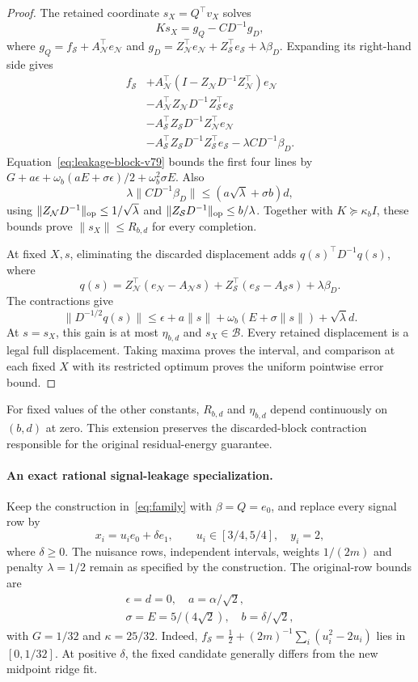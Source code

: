 \begin{proof}
The retained coordinate $s_X=Q^\top v_X$ solves
\[
 Ks_X=g_Q-CD^{-1}g_D,
\]
where $g_Q=f_{\mathcal S}+A_{\mathcal N}^\top e_{\mathcal N}$ and
$g_D=Z_{\mathcal N}^\top e_{\mathcal N}+Z_{\mathcal S}^\top e_{\mathcal S}+\lambda\beta_D$.
Expanding its right-hand side gives
\begin{align*}
 f_{\mathcal S}
 &+A_{\mathcal N}^\top(I-Z_{\mathcal N}D^{-1}Z_{\mathcal N}^\top)e_{\mathcal N}\\
 &-A_{\mathcal N}^\top Z_{\mathcal N}D^{-1}Z_{\mathcal S}^\top e_{\mathcal S}\\
 &-A_{\mathcal S}^\top Z_{\mathcal S}D^{-1}Z_{\mathcal N}^\top e_{\mathcal N}\\
 &-A_{\mathcal S}^\top Z_{\mathcal S}D^{-1}Z_{\mathcal S}^\top e_{\mathcal S}
 -\lambda CD^{-1}\beta_D.
\end{align*}
Equation~\eqref{eq:leakage-block-v79} bounds the first four lines by
$G+a\epsilon+\omega_b(aE+\sigma\epsilon)/2+\omega_b^2\sigma E$.
Also
\[
 \lambda\|CD^{-1}\beta_D\|
 \le(a\sqrt\lambda+\sigma b)d,
\]
using $\|Z_{\mathcal N}D^{-1}\|_{\mathrm{op}}\le1/\sqrt\lambda$ and
$\|Z_{\mathcal S}D^{-1}\|_{\mathrm{op}}\le b/\lambda$.
Together with $K\succeq\kappa_bI$, these bounds prove
$\|s_X\|\le R_{b,d}$ for every completion.

At fixed $X,s$, eliminating the discarded displacement adds $q(s)^\top D^{-1}q(s)$, where
\[
 q(s)=Z_{\mathcal N}^\top(e_{\mathcal N}-A_{\mathcal N}s)
 +Z_{\mathcal S}^\top(e_{\mathcal S}-A_{\mathcal S}s)+\lambda\beta_D.
\]
The contractions give
\[
 \|D^{-1/2}q(s)\|
 \le\epsilon+a\|s\|+\omega_b(E+\sigma\|s\|)+\sqrt\lambda d.
\]
At $s=s_X$, this gain is at most $\eta_{b,d}$ and $s_X\in\mathcal B$.
Every retained displacement is a legal full displacement. Taking maxima proves the interval, and comparison at each fixed $X$ with its restricted optimum proves the uniform pointwise error bound.
\end{proof}

For fixed values of the other constants, $R_{b,d}$ and $\eta_{b,d}$ depend continuously on $(b,d)$ at zero. This extension preserves the discarded-block contraction responsible for the original residual-energy guarantee.

\paragraph{An exact rational signal-leakage specialization.}
Keep the construction in~\eqref{eq:family} with $\beta=Q=e_0$, and replace every signal row by
\[
 x_i=u_i e_0+\delta e_1,\qquad u_i\in[3/4,5/4],\quad y_i=2,
\]
where $\delta\ge0$. The nuisance rows, independent intervals, weights $1/(2m)$ and penalty $\lambda=1/2$ remain as specified by the construction. The original-row bounds are
\begin{gather*}
 \epsilon=d=0,\quad a=\alpha/\sqrt2,\\
 \sigma=E=5/(4\sqrt2),\quad b=\delta/\sqrt2,
\end{gather*}
with $G=1/32$ and $\kappa=25/32$.
Indeed, $f_{\mathcal S}=\tfrac12+(2m)^{-1}\sum_i(u_i^2-2u_i)$ lies in $[0,1/32]$.
At positive $\delta$, the fixed candidate generally differs from the new midpoint ridge fit.

